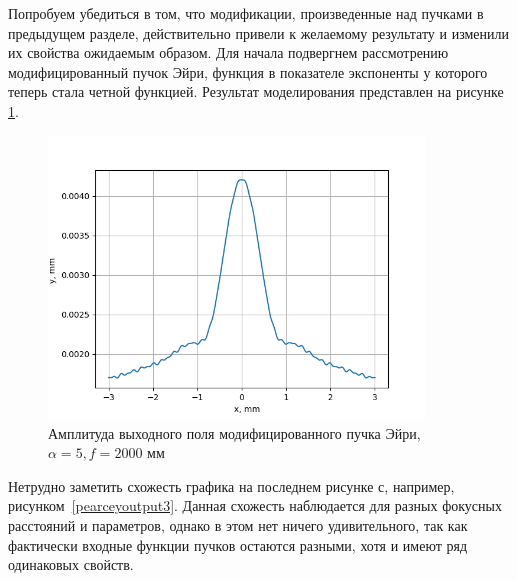 {    Попробуем убедиться в том, что модификации, произведенные над пучками в предыдущем разделе,
    действительно привели к желаемому результату и изменили их свойства ожидаемым образом.
    Для начала подвергнем рассмотрению модифицированный пучок Эйри,
    функция в показателе экспоненты у которого теперь стала четной функцией.
    Результат моделирования представлен на рисунке \ref{aieven_output}.
    \begin{figure}[H]
        \begin{center}
            \includegraphics[width=10cm]{plots/aieven_output}
            \caption{Амплитуда выходного поля модифицированного пучка Эйри, $ \alpha  = 5, f = 2000$ мм}
            \label{aieven_output}
        \end{center}
    \end{figure}
    Нетрудно заметить схожесть графика на последнем рисунке с, например,
    рисунком~\ref{pearceyoutput3}. Данная схожесть наблюдается для разных фокусных расстояний и параметров,
    однако в этом нет ничего удивительного, так как фактически входные функции пучков остаются разными,
    хотя и имеют ряд одинаковых свойств.

}
